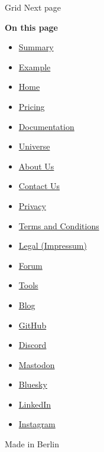 { Grid } { Next page }

\textbf{On this page}

\begin{itemize}
\tightlist
\item
  \hyperref[summary]{Summary}
\item
  \hyperref[example]{Example}
\end{itemize}

\begin{itemize}
\tightlist
\item
  \href{/}{Home}
\item
  \href{/pricing/}{Pricing}
\item
  \href{/docs/}{Documentation}
\item
  \href{/universe/}{Universe}
\item
  \href{/about/}{About Us}
\item
  \href{/contact/}{Contact Us}
\item
  \href{/privacy/}{Privacy}
\item
  \href{https://typst.app/terms}{Terms and Conditions}
\item
  \href{/legal/}{Legal (Impressum)}
\end{itemize}

\begin{itemize}
\tightlist
\item
  \href{https://forum.typst.app}{Forum}
\item
  \href{/tools/}{Tools}
\item
  \href{/blog/}{Blog}
\item
  \href{https://github.com/typst/}{GitHub}
\item
  \href{https://discord.gg/2uDybryKPe}{Discord}
\item
  \href{https://mastodon.social/@typst}{Mastodon}
\item
  \href{https://bsky.app/profile/typst.app}{Bluesky}
\item
  \href{https://www.linkedin.com/company/typst/}{LinkedIn}
\item
  \href{https://instagram.com/typstapp/}{Instagram}
\end{itemize}

Made in Berlin
